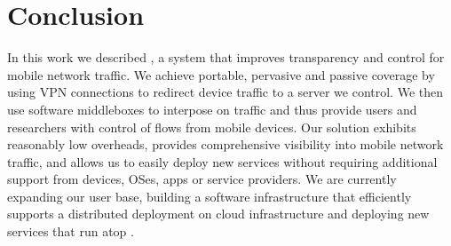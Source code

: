 \section{Conclusion}
\label{sec:conclusion}
In this work we described \meddle, a system that improves transparency and 
control for mobile network traffic. We achieve portable, pervasive and passive 
coverage by using VPN connections to redirect device traffic  
to a server we control. We then use software middleboxes to interpose on 
traffic and thus provide users and researchers with control of flows from mobile devices. 
Our solution exhibits reasonably low overheads, provides comprehensive 
visibility into mobile network traffic, and allows us to easily deploy new 
services without requiring additional support from devices, OSes, apps or 
service providers. We are currently expanding our user base, building a 
software infrastructure that efficiently supports a distributed deployment on cloud 
infrastructure and deploying new services that run atop \meddle.